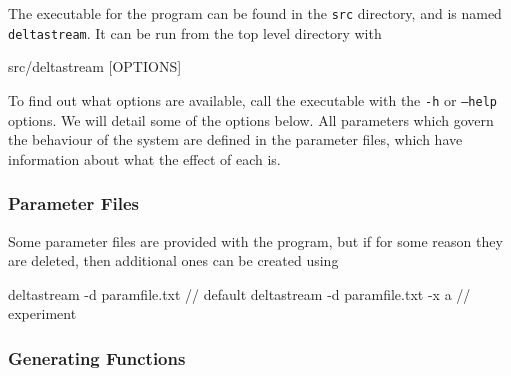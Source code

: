 \documentclass[a4paper,11pt]{article}
\begin{document}
\begin{appendices}
   The executable for the program can be found in the \texttt{src} directory,
   and is named \texttt{deltastream}. It can be run from the top level directory
   with
   \begin{verbatimtab}
   src/deltastream [OPTIONS]
   \end{verbatimtab}
   To find out what options are available, call the executable with the
   \texttt{-h} or \texttt{--help} options. We will detail some of the options
   below. All parameters which govern the behaviour of the system are defined in
   the parameter files, which have information about what the effect of each is.
\subsubsection{Parameter Files}
\label{sec-10-2-1}

    Some parameter files are provided with the program, but if for some reason
    they are deleted, then additional ones can be created using
    \begin{verbatimtab}
    deltastream -d paramfile.txt // default
    deltastream -d paramfile.txt -x a // experiment
    \end{verbatimtab}
\subsubsection{Generating Functions}
\label{sec-10-2-2}


\end{appendices}
\end{document}
